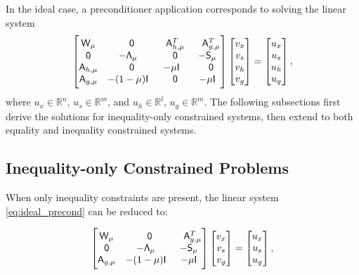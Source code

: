 In the ideal case, a preconditioner application corresponds to solving the
linear system
\begin{equation}\label{eq:ideal_precond}
  \begin{bmatrix} 
	\mathsf{W}_\mu & \phantom{-}\mathsf{0} & \phantom{-}\mathsf{A}_{h,\mu}^T  & \phantom{-}\mathsf{A}_{g,\mu}^T \\
	\mathsf{0}  & -\mathsf{\Lambda}_\mu & \phantom{-}\mathsf{0}   & -\mathsf{S}_\mu \\
	\mathsf{A}_{h, \mu} & \phantom{-}\mathsf{0} &  -\mu \mathsf{I} & \phantom{-}\mathsf{0}  \\
	\mathsf{A}_{g, \mu} &  -(1-\mu)\mathsf{I} &  \phantom{-}\mathsf{0}     &   -\mu \mathsf{I}
\end{bmatrix}
\begin{bmatrix} v_x \\ v_s \\ v_{h} \\  v_{g} \end{bmatrix} 
= 
\begin{bmatrix} u_x \\ u_s \\ u_{h} \\ u_{g}  \end{bmatrix},
\end{equation}
where $u_x \in \mathbb{R}^n$, $u_s \in \mathbb{R}^{m}$, and $u_h \in
\mathbb{R}^{l}$,  $u_g \in \mathbb{R}^{m}$.  The following subsections first derive the 
solutions for inequality-only constrained systems, then extend to both equality and inequality 
constrained systems. 

\subsection{Inequality-only Constrained Problems}
When only inequality constraints are present, the linear system \eqref{eq:ideal_precond} 
can be reduced to: 

\begin{equation}\label{eq:ideal_precond_ineq}
  \begin{bmatrix} 
	\mathsf{W}_\mu & \phantom{-}\mathsf{0} &  \phantom{-}\mathsf{A}_{g,\mu}^T \\
	\mathsf{0}  & -\mathsf{\Lambda}_\mu & -\mathsf{S}_\mu \\
	\mathsf{A}_{g,\mu} &  -(1-\mu)\mathsf{I} & -\mu \mathsf{I}
\end{bmatrix}
\begin{bmatrix} v_x \\ v_s \\ v_g \end{bmatrix} 
= 
\begin{bmatrix} u_x \\ u_s \\ u_g \end{bmatrix},
\end{equation}

